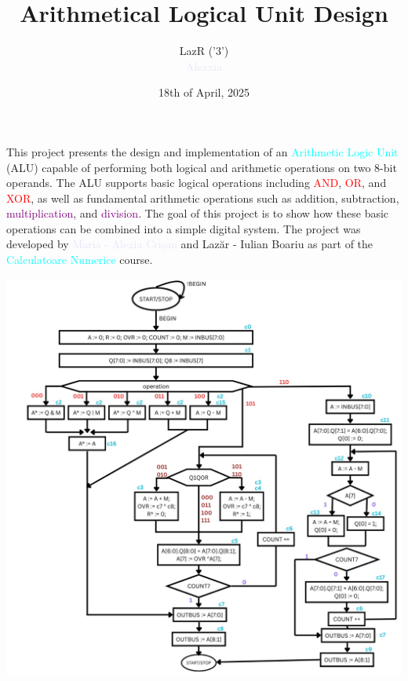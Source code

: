 \documentclass[12pt, letterpaper]{article}
\title{\color{BlueGreen}\textbf{Arithmetical Logical Unit Design}}
\author{
\textcolor{OliveGreen}{LazR} \textcolor{Mahogany}{('3')} \\
\textcolor{Lavender}{Alexxia}
                                        }
\date{18th of April, 2025}
\begin{document}
\maketitle

\newpage

\tableofcontents

\newpage


This project presents the design and implementation of an \textcolor{cyan}{Arithmetic Logic Unit} (ALU)
capable of performing both logical and arithmetic operations on two 8-bit operands. The ALU supports basic logical operations including
\textcolor{red}{AND}, \textcolor{red}{OR}, and \textcolor{red}{XOR},
as well as fundamental arithmetic operations such as
\textcolor{BurntOrange}{addition}, \textcolor{BurntOrange}{subtraction}, \textcolor{purple}{multiplication}, and \textcolor{purple}{division}.
The goal of this project is to show how these basic operations can be combined into a simple digital system.
The project was developed by \textcolor{Lavender}{Maria - Alexia Crișan} and \textcolor{OliveGreen}{Laz\u{a}r - Iulian Boariu} as part of the \textcolor{cyan}{Calculatoare Numerice} course.


\begin{center}
\includegraphics[scale=0.3]{Documentation/FSM}
\end{center}
\end{document}
